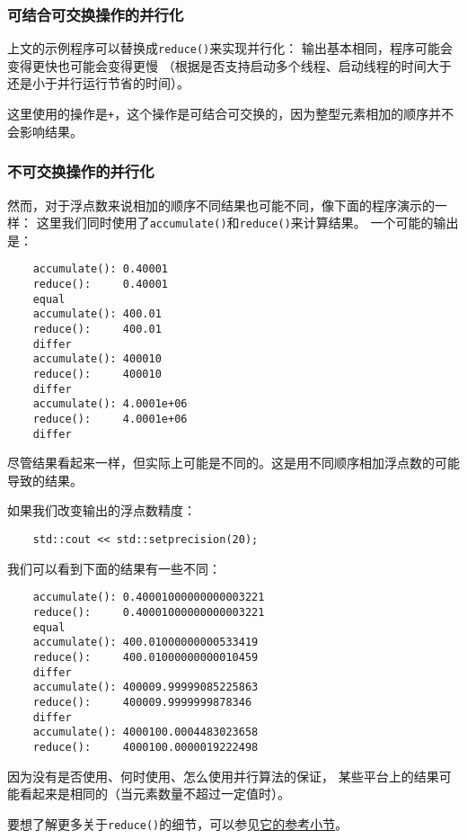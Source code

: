 \subsubsection{可结合可交换操作的并行化}
上文的示例程序可以替换成\texttt{reduce()}来实现并行化：
输出基本相同，程序可能会变得更快也可能会变得更慢
（根据是否支持启动多个线程、启动线程的时间大于还是小于并行运行节省的时间）。

这里使用的操作是\texttt{+}，这个操作是可结合可交换的，因为整型元素相加的顺序并不会影响结果。

\subsubsection{不可交换操作的并行化}
然而，对于浮点数来说相加的顺序不同结果也可能不同，像下面的程序演示的一样：
这里我们同时使用了\texttt{accumulate()}和\texttt{reduce()}来计算结果。
一个可能的输出是：
\begin{lstlisting}
    accumulate(): 0.40001
    reduce():     0.40001
    equal
    accumulate(): 400.01
    reduce():     400.01
    differ
    accumulate(): 400010
    reduce():     400010
    differ
    accumulate(): 4.0001e+06
    reduce():     4.0001e+06
    differ
\end{lstlisting}
尽管结果看起来一样，但实际上可能是不同的。这是用不同顺序相加浮点数的可能导致的结果。

如果我们改变输出的浮点数精度：
\begin{lstlisting}
    std::cout << std::setprecision(20);
\end{lstlisting}
我们可以看到下面的结果有一些不同：
\begin{lstlisting}
    accumulate(): 0.40001000000000003221
    reduce():     0.40001000000000003221
    equal
    accumulate(): 400.01000000000533419
    reduce():     400.01000000000010459
    differ
    accumulate(): 400009.99999085225863
    reduce():     400009.9999999878346
    differ
    accumulate(): 4000100.0004483023658
    reduce():     4000100.0000019222498
\end{lstlisting}
因为没有是否使用、何时使用、怎么使用并行算法的保证，
某些平台上的结果可能看起来是相同的（当元素数量不超过一定值时）。

要想了解更多关于\texttt{reduce()}的细节，可以参见\hyperref[ch23.2.1]{它的参考小节}。


